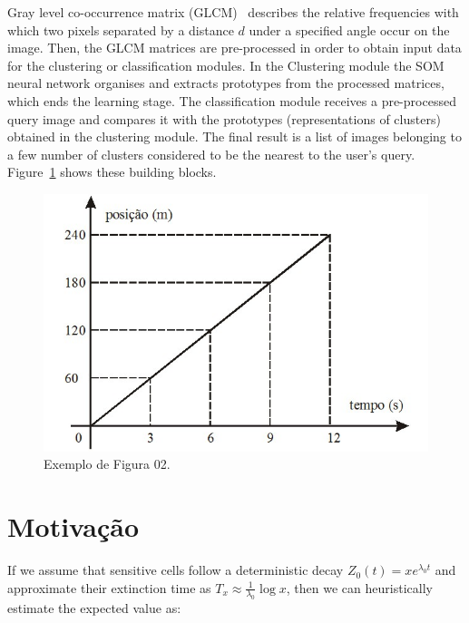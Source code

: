 \documentclass{classe_cn}                 %
\begin{document}
Gray level co-occurrence matrix (GLCM)~\cite{Ferris:2003} describes the relative frequencies with which two pixels separated by a distance $d$ under a specified angle occur on the image. Then, the GLCM matrices are pre-processed in order to obtain input data for the clustering or classification modules. In the Clustering module the SOM neural network organises and extracts prototypes from the processed matrices, which ends the learning stage. The classification module receives a pre-processed query image and compares it with the prototypes (representations of clusters) obtained in the clustering module. The final result is a list of images belonging to a few number of clusters considered to be the nearest to the user's query. Figure~\ref{tag_figura_02} shows these building blocks.

\begin{figure}[h!]
  \begin{center}
    \includegraphics[width=1.0 \textwidth]{figura02.jpg}
    \caption{Exemplo de Figura 02.} 
    \label{tag_figura_02}
  \end{center}
\end{figure}

\section{Motivação}

If we assume that sensitive cells follow a deterministic decay $Z_0(t) = xe^{\lambda_0 t}$ and approximate their extinction time as $T_x \approx \frac{1}{\lambda_0} \log x$, then we can heuristically estimate the expected value as:
\end{document}
